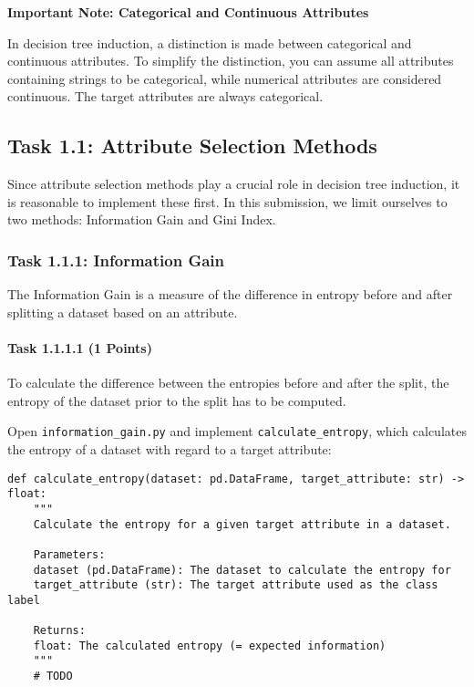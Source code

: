 \documentclass[
english,
smallborders
]{i6prcsht}
\newcommand{\points}[1]{\hfill \color{red}(#1 Points)\color{black}}
\begin{document}
\vspace*{1mm}

\begin{mdframed}
	\begin{em}
		\textbf{Important Note: Categorical and Continuous Attributes}
		
		In decision tree induction, a distinction is made between categorical and continuous attributes. To simplify the distinction, you can assume all attributes containing strings to be categorical, while numerical attributes are considered continuous. The target attributes are always categorical.
	\end{em}
\end{mdframed}

\subsection*{Task 1.1: Attribute Selection Methods}

Since attribute selection methods play a crucial role in decision tree induction, it is reasonable to implement these first. In this submission, we limit ourselves to two methods: Information Gain and Gini Index.

\subsubsection*{Task 1.1.1: Information Gain}

The Information Gain is a measure of the difference in entropy before and after splitting a dataset based on an attribute.

\paragraph*{Task 1.1.1.1 \points{1}} \hfill

To calculate the difference between the entropies before and after the split, the entropy of the dataset prior to the split has to be computed.

Open \texttt{information\_gain.py} and implement \texttt{calculate\_entropy}, which calculates the entropy of a dataset with regard to a target attribute:

\vspace*{0.3cm}

\begin{lstlisting}
def calculate_entropy(dataset: pd.DataFrame, target_attribute: str) -> float:
	"""
	Calculate the entropy for a given target attribute in a dataset.

	Parameters:
	dataset (pd.DataFrame): The dataset to calculate the entropy for
	target_attribute (str): The target attribute used as the class label

	Returns:
	float: The calculated entropy (= expected information)
	"""
	# TODO
\end{lstlisting}
\end{document}
